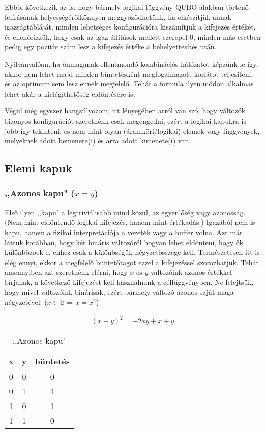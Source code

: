 Ebből következik az is, hogy bármely logikai függvény QUBO alakban történő felírásának helyességérőlkönnyen meggyőződhetünk, ha elkészítjük annak igazságtábláját, minden lehetséges konfigurációra kiszámítjuk a kifejezés értékét, és ellenőrizzük, hogy csak az igaz állítások mellett szerepel 0, minden más esetben pedig egy pozitív szám lesz a kifejezés értéke a behelyettesítés után.

Nyilvánvalóan, ha önmagának ellentmondó kombinációs hálózatot képzünk le így, akkor nem lehet majd minden büntetésként megfogalmazott korlátot teljesíteni, és az optimum sem lesz ennek megfelelő. Tehát a formula ilyen módon alkalmas lehet akár a kielégíthetőség eldöntésére is.

Végül még egyszer hangsúlyozom, itt lényegében arról van szó, hogy változók bizonyos konfigurációt szeretnénk csak megengedni, ezért a logikai kapukra is jobb így tekinteni, és nem mint olyan (áramköri/logikai) elemek vagy függvények, melyeknek adott bemenete(i) és arra adott kimenete(i) van.

\subsection{Elemi kapuk}\label{sec:theoryElementaryGates}

\subsubsection{,,Azonos kapu" ($x=y$)}


Első ilyen ,,kapu" a legtriviálisabb mind közül, az egyenlőség vagy azonosság. (Nem mint eldöntendő logikai kifejezés, hanem mint értékadás.) Igazából nem is kapu, hanem a fizikai interpretációja a vezeték vagy a buffer volna. Azt már láttuk korábban, hogy két bináris változóról hogyan lehet eldönteni, hogy ők különbözőek-e, ehhez csak a különbségük négyzetösszege kell. Természetesen itt is elég ennyi, ekkor a megfelelő büntetőtagot ezzel a kifejezéssel szorozhatjuk. Tehát amennyiben azt szeretnénk elérni, hogy $x$ és $y$ változóink azonos értékkel bírjanak, a következő kifejezést kell használnunk a célfüggvényben. Ne felejtsük, hogy mivel változóink binárisak, ezért bármely változó azonos saját maga négyzetével. ($x \in \mathbb{B} \Rightarrow x = x^2$)

\begin{align}
	(x-y)^2=-2xy+x+y
\end{align}

\begin{table}[ht]
	\footnotesize
	\centering
	\begin{tabular}{ c c c }
		\toprule
		x & y & büntetés \\
		\midrule
		0 & 0 & 0 \\
		0 & 1 & 1 \\
		1 & 0 & 1 \\
		1 & 1 & 0 \\		
		\bottomrule
	\end{tabular}
	\caption{,,Azonos kapu"}
	\label{tab:SAMEgate}
\end{table}

